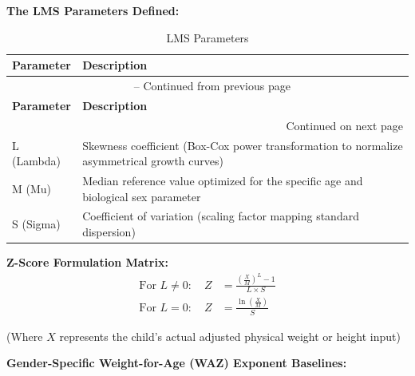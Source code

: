 \documentclass[12pt, a4paper]{report}
\begin{document}
\noindent \textbf{The LMS Parameters Defined:}

\vspace{0.3cm}
\begin{longtable}{p{3.5cm} p{10.5cm}}
    \caption{LMS Parameters} \label{tab:lms_params} \\
    \toprule
    \textbf{Parameter} & \textbf{Description} \\
    \midrule
    \endfirsthead
    \multicolumn{2}{c}{{\tablename\ \thetable{} -- Continued from previous page}} \\
    \toprule
    \textbf{Parameter} & \textbf{Description} \\
    \midrule
    \endhead
    \midrule
    \multicolumn{2}{r}{{Continued on next page}} \\
    \endfoot
    \bottomrule
    \endlastfoot
    L (Lambda) & Skewness coefficient (Box-Cox power transformation to normalize asymmetrical growth curves) \\
    \addlinespace
    M (Mu) & Median reference value optimized for the specific age and biological sex parameter \\
    \addlinespace
    S (Sigma) & Coefficient of variation (scaling factor mapping standard dispersion) \\
\end{longtable}
\vspace{0.3cm}

\noindent \textbf{Z-Score Formulation Matrix:}
\begin{align}
    \text{For } L \neq 0: \quad Z &= \frac{\left(\frac{X}{M}\right)^L - 1}{L \times S} \\
    \text{For } L = 0: \quad Z &= \frac{\ln\left(\frac{X}{M}\right)}{S}
\end{align}

(Where \(X\) represents the child's actual adjusted physical weight or height input)

\noindent \textbf{Gender-Specific Weight-for-Age (WAZ) Exponent Baselines:}
\end{document}
